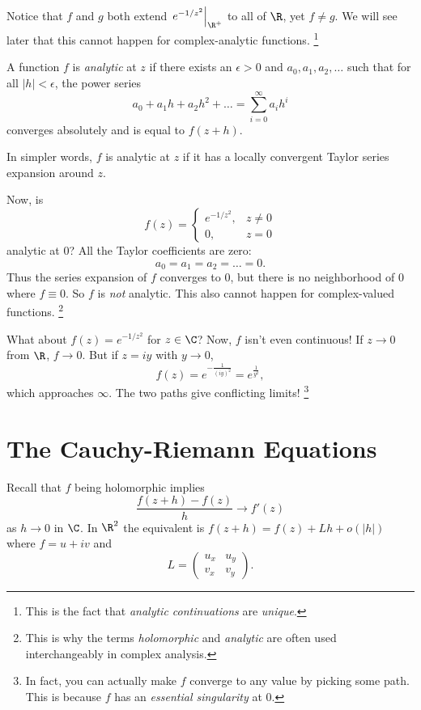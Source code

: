 Notice that $f$ and $g$ both extend
$\left.e^{-1 / z^2}\right\rvert_{\R^+}$ to all of $\R$,
yet $f \ne g$. We will see later that this cannot
happen for complex-analytic functions.
\footnote{This is the fact that \textit{analytic continuations} are \textit{unique}.}

\begin{tcolorbox}[title=Definition (Analytic)]
  A function $f$ is \textit{analytic} at $z$ if there
  exists an $\epsilon > 0$ and $a_0, a_1, a_2, \dots$
  such that for all $|h| < \epsilon$, the power series
  \[
  a_0 + a_1 h + a_2 h^2 + \dots
  = \sum_{i = 0}^{\infty} a_i h^i
  \] 
  converges absolutely and is equal to $f(z + h)$.
\end{tcolorbox}

In simpler words, $f$ is analytic at $z$ if it has a
locally convergent Taylor series expansion around $z$.

Now, is
\[
f(z) =
\begin{cases}
  e^{-1 / z^2}, & z \neq 0 \\
  0, & z = 0
\end{cases}
\] 
analytic at $0$? All the Taylor coefficients
are zero:
\[
  a_0 = a_1 = a_2 = \dots = 0
.\]
Thus the series expansion of $f$ converges to $0$, but
there is no neighborhood of $0$ where $f \equiv 0$.
So $f$ is \textit{not} analytic. This also cannot
happen for complex-valued functions.
\footnote{This is why the terms \textit{holomorphic} and
\textit{analytic} are often used interchangeably in
  complex analysis.}

What about $f(z) = e^{-1 / z^2}$ for $z \in \C$?
Now, $f$ isn't even continuous! If $z \to 0$
from $\R$, $f \to 0$. But if $z = iy$ with $y \to 0$,
\[f(z) = e^{-\frac{1}{(iy)^2}} = e^{\frac{1}{y^2}},\]
which approaches $\infty$. The two paths give conflicting
limits!
\footnote{In fact, you can actually make $f$ converge to
  any value by picking some path. This is because $f$
  has an \textit{essential singularity} at $0$.}

\section{The Cauchy-Riemann Equations}
Recall that $f$ being holomorphic implies
\[
  \frac{f(z + h) - f(z)}{h} \to f'(z)
\] 
as $h \to 0$ in $\C$. In $\R^2$ the equivalent is
$f(z + h) = f(z) + Lh + o(|h|)$ where $f = u + iv$ and
\[
L =
\left(\begin{matrix}
  u_x & u_y \\
  v_x & v_y
\end{matrix}\right)
.\] 

